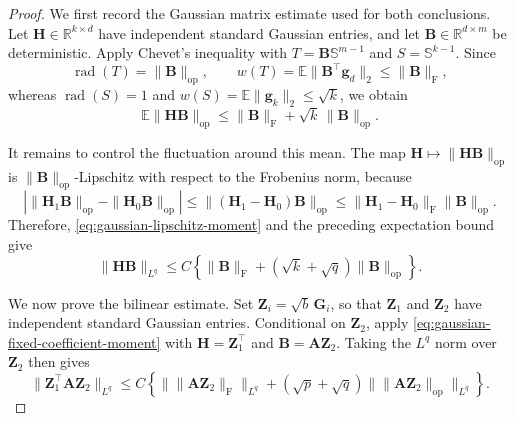 \documentclass[11pt]{article}
\newcommand{\trans}{\top}
\begin{document}
\begin{proof}
We first record the Gaussian matrix estimate used for both conclusions.
Let $\bm H\in\mathbb R^{k\times d}$ have independent standard Gaussian
entries, and let $\bm B\in\mathbb R^{d\times m}$ be deterministic. Apply
Chevet's inequality \cite[Section~8.7]{vershynin2018high} with
$T=\bm B\mathbb S^{m-1}$ and $S=\mathbb S^{k-1}$. Since
\[
  \operatorname{rad}(T)=\|\bm B\|_{\mathrm{op}},
  \qquad
  w(T)
  =
  \mathbb E\|\bm B^\trans\bm g_d\|_2
  \le
  \|\bm B\|_{\mathrm F},
\]
whereas
$\operatorname{rad}(S)=1$ and
$w(S)=\mathbb E\|\bm g_k\|_2\le\sqrt k$, we obtain
\[
  \mathbb E\|\bm H\bm B\|_{\mathrm{op}}
  \le
  \|\bm B\|_{\mathrm F}
  +
  \sqrt k\,\|\bm B\|_{\mathrm{op}}.
\]

It remains to control the fluctuation around this mean. The map
$\bm H\mapsto\|\bm H\bm B\|_{\mathrm{op}}$ is
$\|\bm B\|_{\mathrm{op}}$-Lipschitz with respect to the Frobenius norm,
because
\[
  \left|
    \|\bm H_1\bm B\|_{\mathrm{op}}
    -
    \|\bm H_0\bm B\|_{\mathrm{op}}
  \right|
  \le
  \|(\bm H_1-\bm H_0)\bm B\|_{\mathrm{op}}
  \le
  \|\bm H_1-\bm H_0\|_{\mathrm F}
  \|\bm B\|_{\mathrm{op}}.
\]
Therefore, \cref{eq:gaussian-lipschitz-moment} and the preceding expectation
bound give
\begin{equation}
\label{eq:gaussian-fixed-coefficient-moment}
  \|\bm H\bm B\|_{L^q}
  \le
  C\left\{
    \|\bm B\|_{\mathrm F}
    +
    (\sqrt k+\sqrt q)\|\bm B\|_{\mathrm{op}}
  \right\}.
\end{equation}

We now prove the bilinear estimate. Set
$\bm Z_i=\sqrt b\,\bm G_i$, so that
$\bm Z_1$ and $\bm Z_2$ have independent standard Gaussian entries.
Conditional on $\bm Z_2$, apply
\cref{eq:gaussian-fixed-coefficient-moment} with
$\bm H=\bm Z_1^\trans$ and $\bm B=\bm A\bm Z_2$. Taking the \(L^q\) norm
over $\bm Z_2$ then gives
\begin{equation}
\label{eq:gaussian-bilinear-conditional}
  \|\bm Z_1^\trans\bm A\bm Z_2\|_{L^q}
  \le
  C\left\{
    \bigl\|\|\bm A\bm Z_2\|_{\mathrm F}\bigr\|_{L^q}
    +
    (\sqrt p+\sqrt q)
    \bigl\|\|\bm A\bm Z_2\|_{\mathrm{op}}\bigr\|_{L^q}
  \right\}.
\end{equation}


\end{proof}
\end{document}
